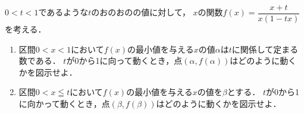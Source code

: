 \documentclass[../../main.tex]{subfiles}
\begin{document}
$0<t<1$であるような$t$のおのおのの値に対して，
$x$の関数$f(x)=\dfrac{x+t}{x(1-tx)}$を考える．
\begin{enumerate}
  \item 区間$0<x<1$において$f(x)$の最小値を与える$x$の値$\alpha$は$t$に関係して定まる数である．
    $t$が0から1に向って動くとき，点$(\alpha,f(\alpha))$はどのように動くかを図示せよ．
  \item 区間$0<x \leqq t$において$f(x)$の最小値を与える$x$の値を$\beta$とする．
    $t$が0から1に向かって動くとき，点$(\beta,f(\beta))$はどのように動くかを図示せよ．
\end{enumerate}
\end{document}
